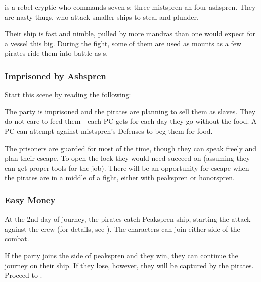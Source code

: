 \npcCrypticCaptain{} is a rebel cryptic who commands seven \enemySprenPirate{}s: three mistspren an four ashspren. They are nasty thugs, who attack smaller ships to steal and plunder.

Their ship is fast and nimble, pulled by more mandras than one would expect for a vessel this big. During the fight, some of them are used as mounts as a few pirates ride them into battle as \enemyMandraRider{}s.

\newpage
\subsubsection{Imprisoned by Ashspren}
\label{ssec:sailingPiratesCaptured}

Start this scene by reading the following:


The party is imprisoned and the pirates are planning to sell them as slaves. They do not care to feed them - each PC gets \exhausted[1] for each day they go without the food. A PC can attempt \skillPersuasion{} against mistspren's Defenses to beg them for food.

The prisoners are guarded for most of the time, though they can speak freely and plan their escape. To open the lock they would need succeed on  (assuming they can get proper tools for the job). There will be an opportunity for escape when the pirates are in a middle of a fight, either with peakspren or honorspren.

\subsubsection{Easy Money}

At the 2nd day of journey, the pirates catch Peakspren ship, starting the attack against the crew (for details, see ). The characters can join either side of the combat.

If the party joins the side of peakspren and they win, they can continue the journey on their ship. If they lose, however, they will be captured by the pirates. Proceed to .

